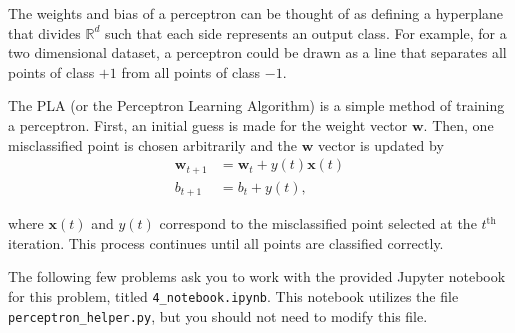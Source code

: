 The weights and bias of a perceptron can be thought of as defining a hyperplane that divides $\mathbb{R}^d$ such that each side represents an output class. For example, for a two dimensional dataset, a perceptron could be drawn as a line that separates all points of class $+1$ from all points of class $-1$.

The PLA (or the Perceptron Learning Algorithm) is a simple method of training a perceptron. First, an initial guess is made for the weight vector $\mathbf{w}$. Then, one misclassified point is chosen arbitrarily and the $\mathbf{w}$ vector is updated by
\begin{align*}
  \mathbf{w}_{t+1} &= \mathbf{w}_t + y(t)\mathbf{x}(t) \\
  b_{t + 1} &= b_t + y(t),
\end{align*}

where $\mathbf{x}(t)$ and $y(t)$ correspond to the misclassified point selected at the $t^\text{th}$ iteration.
This process continues until all points are classified correctly.

The following few problems ask you to work with the provided Jupyter notebook for this problem, titled \texttt{4_notebook.ipynb}. This notebook utilizes the file \texttt{perceptron_helper.py}, but you should not need to modify this file.

